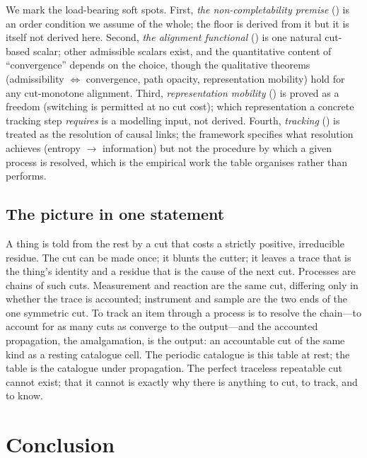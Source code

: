 \documentclass[11pt,a4paper]{article}
\theoremstyle{thmstyle}
\theoremstyle{definition}
\theoremstyle{remark}
\begin{document}
We mark the load-bearing soft spots. First, \emph{the non-completability
premise} () is an order condition we assume of the
whole; the floor is derived from it but it is itself not derived here.
Second, \emph{the alignment functional} () is one
natural cut-based scalar; other admissible scalars exist, and the
quantitative content of ``convergence'' depends on the choice, though the
qualitative theorems (admissibility $\iff$ convergence, path opacity,
representation mobility) hold for any cut-monotone alignment. Third,
\emph{representation mobility} () is proved as a
freedom (switching is permitted at no cut cost); which representation a
concrete tracking step \emph{requires} is a modelling input, not derived.
Fourth, \emph{tracking} () is treated as the
resolution of causal links; the framework specifies what resolution
achieves (entropy $\to$ information) but not the procedure by which a given
process is resolved, which is the empirical work the table organises rather
than performs.

\subsection{The picture in one statement}

A thing is told from the rest by a cut that costs a strictly positive,
irreducible residue. The cut can be made once; it blunts the cutter; it
leaves a trace that is the thing's identity and a residue that is the cause
of the next cut. Processes are chains of such cuts. Measurement and
reaction are the same cut, differing only in whether the trace is
accounted; instrument and sample are the two ends of the one symmetric cut.
To track an item through a process is to resolve the chain---to account for
as many cuts as converge to the output---and the accounted propagation, the
amalgamation, is the output: an accountable cut of the same kind as a
resting catalogue cell. The periodic catalogue is this table at rest; the
table is the catalogue under propagation. The perfect traceless repeatable
cut cannot exist; that it cannot is exactly why there is anything to cut,
to track, and to know.

\section{Conclusion}
\label{sec:conclusion}
\end{document}
